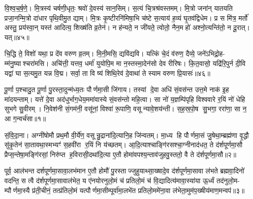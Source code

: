 वि॒श्व॒च॒र्\mbox{}ष॒णे॒। मि॒त्रस्य॑ चर्\mbox{}षणी॒धृतः॒ श्रवो॑ दे॒वस्य॑ सान॒सिम्। स॒त्यं चि॒त्रश्र॑वस्तमम्। मि॒त्रो जना॑न् यातयति प्रजा॒नन्मि॒त्रो दा॑धार पृथि॒वीमु॒त द्याम्। मि॒त्रः कृ॒ष्टीरनि॑मिषा॒भि च॑ष्टे स॒त्याय॑ ह॒व्यं घृ॒तव॑द्विधेम। प्र स मि॑त्र॒ मर्तो॑ अस्तु॒ प्रय॑स्वा॒न् यस्त॑ आदित्य॒ शिख्ष॑ति व्र॒तेन॑। न ह॑न्यते॒ न जी॑यते॒ त्वोतो॒ नैन॒महो॑ अश्नो॒त्यन्ति॑तो॒ न दू॒रात्। यत्॥४५॥

चि॒द्धि ते॒ विशो॑ यथा॒ प्र दे॑व वरुण व्र॒तम्। मि॒नी॒मसि॒ द्यवि॑द्यवि। यत्किं चे॒दं व॑रुण॒ दैव्ये॒ जने॑ऽभिद्रो॒ह- म्म॑नु॒ष्याश्चरा॑मसि। अचि॑त्ती॒ यत्तव॒ धर्मा॑ युयोपि॒म मा न॒स्तस्मा॒देन॑सो देव रीरिषः। कि॒त॒वासो॒ यद्रि॑रि॒पुर्न दी॒वि यद्वा॑ घा स॒त्यमु॒त यन्न वि॒द्म। सर्वा॒ ता वि ष्य॑ शिथि॒रेव॑ दे॒वाथा॑ ते स्याम वरुण प्रि॒यासः॑॥४६॥

{\anuvakamend[{सोमो॒ गोषु॒ मा र॒यिं मन्त्रो॒ यच्छि॑थि॒रा स॒प्त च॑॥11॥}]}


{}

\setcounter{anuvakam}{0}
पू॒र्णा प॒श्चादु॒त पू॒र्णा पु॒रस्ता॒दुन्म॑ध्य॒तः पौर्णमा॒सी जि॑गाय। तस्यां दे॒वा अधि॑ सं॒वस॑न्त उत्त॒मे नाक॑ इ॒ह मा॑दयन्ताम्। यत्ते॑ दे॒वा अद॑धुर्भाग॒धेय॒ममा॑वास्ये सं॒वस॑न्तो महि॒त्वा। सा नो॑ य॒ज्ञम्पि॑पृहि विश्ववारे र॒यिं नो॑ धेहि सुभगे सु॒वीरम्। नि॒वेश॑नी सं॒गम॑नी॒ वसू॑नां॒ विश्वा॑ रू॒पाणि॒ वसून्यावे॒शय॑न्ती। स॒ह॒स्र॒पो॒ष सु॒भगा॒ ररा॑णा॒ सा न॒ आ ग॒न्वर्च॑सा॥१॥

सं॒वि॒दा॒ना। अग्नी॑षोमौ प्रथ॒मौ वी॒र्ये॑ण॒ वसून्रु॒द्राना॑दि॒त्यानि॒ह जि॑न्वतम्। मा॒ध्य हि पौर्णमा॒सं जु॒षेथा॒म्ब्रह्म॑णा वृ॒द्धौ सु॑कृ॒तेन॑ सा॒तावथा॒स्मभ्यꣳ॑ स॒हवी॑रा र॒यिं नि य॑च्छतम्। आ॒दि॒त्याश्चाङ्गि॑रसश्चा॒ग्नीनाद॑धत॒ ते द॑र्\mbox{}शपूर्णमा॒सौ प्रैप्स॒न्तेषा॒मङ्गि॑रसां॒ निरु॑प्त ह॒विरासी॒दथा॑दि॒त्या ए॒तौ होमा॑वपश्य॒न्ताव॑जुहवु॒स्ततो॒ वै ते द॑र्\mbox{}शपूर्णमा॒सौ॥२॥

पूर्व॒ आल॑भन्त दर्\mbox{}शपूर्णमा॒सावा॒लभ॑मान ए॒तौ होमौ॑ पु॒रस्ताज्जुहुयाथ्सा॒ख्षादे॒व द॑र्\mbox{}शपूर्णमा॒सावा ल॑भते ब्रह्मवा॒दिनो॑ वदन्ति॒ स त्वै द॑र्\mbox{}शपूर्णमा॒सावाल॑भेत॒ य ए॑नयोरनुलो॒मं च॑ प्रतिलो॒मं च॑ वि॒द्यादित्य॑मावा॒स्या॑या ऊ॒र्ध्वं तद॑नुलो॒म- म्पौर्णमा॒स्यै प्र॑ती॒चीनं॒ तत्प्र॑तिलो॒मं यत्पौर्णमा॒सीम्पूर्वा॑मा॒लभे॑त प्रतिलो॒ममे॑ना॒वा ल॑भेता॒मुम॑प॒ख्षीय॑माण॒मन्वप॑॥३॥

